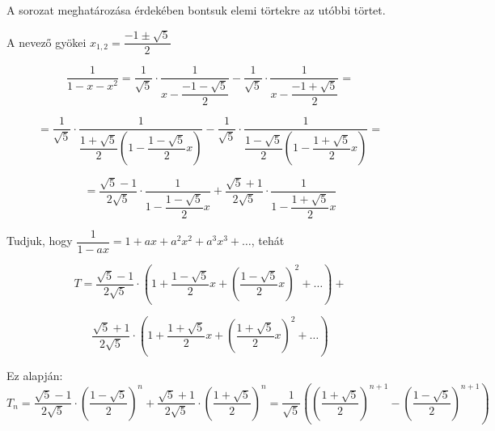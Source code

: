 \begin{solution}
\begin{enumerate}
A sorozat meghatározása érdekében bontsuk elemi törtekre az utóbbi
törtet.

A nevező gyökei $x_{1,2}=\dfrac{-1\pm\sqrt{5}}{2}$

\[
\dfrac{1}{1-x-x^{2}}=\dfrac{1}{\sqrt{5}}\cdot\dfrac{1}{x-\dfrac{-1-\sqrt{5}}{2}}-\dfrac{1}{\sqrt{5}}\cdot\dfrac{1}{x-\dfrac{-1+\sqrt{5}}{2}}=
\]

\[
=\dfrac{1}{\sqrt{5}}\cdot\dfrac{1}{{\dfrac{1+\sqrt{5}}{2}}\left(1-\dfrac{1-\sqrt{5}}{2}x\right)}-\dfrac{1}{\sqrt{5}}\cdot\dfrac{1}{{\dfrac{1-\sqrt{5}}{2}}\left(1-\dfrac{1+\sqrt{5}}{2}x\right)}=
\]

\[
=\dfrac{\sqrt{5}-1}{2\sqrt{5}}\cdot\dfrac{1}{1-\dfrac{1-\sqrt{5}}{2}x}+\dfrac{\sqrt{5}+1}{2\sqrt{5}}\cdot\dfrac{1}{1-\dfrac{1+\sqrt{5}}{2}x}
\]

Tudjuk, hogy $\dfrac{1}{1-ax}=1+ax+a^{2}x^{2}+a^{3}x^{3}+\dots$,
tehát

\[
T=\dfrac{\sqrt{5}-1}{2\sqrt{5}}\cdot\left(1+\dfrac{1-\sqrt{5}}{2}x+\left(\dfrac{1-\sqrt{5}}{2}x\right)^{2}+\dots\right)+
\]

\[
\dfrac{\sqrt{5}+1}{2\sqrt{5}}\cdot\left(1+\dfrac{1+\sqrt{5}}{2}x+\left(\dfrac{1+\sqrt{5}}{2}x\right)^{2}+\dots\right)
\]

Ez alapján: 
\[
T_{n}=\dfrac{\sqrt{5}-1}{2\sqrt{5}}\cdot\left(\dfrac{1-\sqrt{5}}{2}\right)^{n}+\dfrac{\sqrt{5}+1}{2\sqrt{5}}\cdot\left(\dfrac{1+\sqrt{5}}{2}\right)^{n}=\dfrac{1}{\sqrt{5}}\left(\left(\dfrac{1+\sqrt{5}}{2}\right)^{n+1}-\left(\dfrac{1-\sqrt{5}}{2}\right)^{n+1}\right)
\]

\end{enumerate}
\end{solution}

